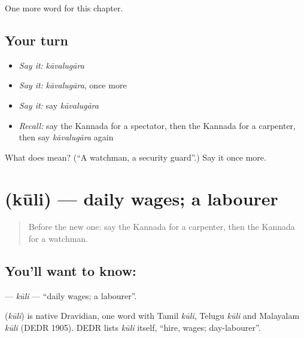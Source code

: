 \begin{grammarlens}[title={What you've built}]
One more word for this chapter.
\end{grammarlens}

\subsection*{Your turn}
\begin{itemize}
\raggedright
  \item \emph{Say it:} \emph{kāvalugāra}
  \item \emph{Say it:} \emph{kāvalugāra}, once more
  \item \emph{Say it:} say \emph{kāvalugāra}
  \item \emph{Recall:} say the Kannada for a spectator, then the Kannada for a carpenter, then say \emph{kāvalugāra} again
\end{itemize}

\begin{tcolorbox}[breakable,colback=teal!4,colframe=teal!35!black,title={Before you move on}]
What does  mean? (\textquotedblleft{}A watchman, a security guard\textquotedblright{}.) Say it once more.
\end{tcolorbox}
\section[\texorpdfstring{\kn{ಕೂಲಿ} (kūli)}{ಕೂಲಿ (kūli)}]{ (kūli) — daily wages; a labourer}

\label{lesson:KA-C197-kuli}



\begin{quote}
Before the new one: say the Kannada for a carpenter, then the Kannada for a watchman.
\end{quote}

\subsection*{You'll want to know: }
\textbf{} — \emph{kūli} — \textquotedblleft{}daily wages; a labourer\textquotedblright{}.

\begin{cousinweb}
\textbf{} (\emph{kūli}) is native Dravidian, one word with Tamil \emph{kūli}, Telugu \emph{kūli} and Malayalam \emph{kūli} (DEDR 1905). DEDR lists \emph{kūli} itself, \textquotedblleft{}hire, wages; day-labourer\textquotedblright{}.
\end{cousinweb}

